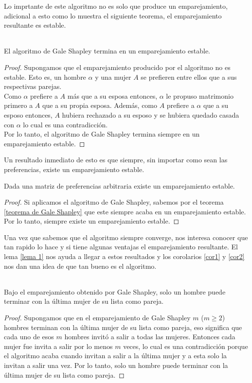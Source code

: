 Lo imprtante de este algoritmo no es solo que produce un emparejamiento, adicional a esto como lo muestra el siguiente teorema, el emparejamiento resultante es estable. 
\begin{teo} \cite{GaleShapley} \\
\label{teorema de Gale Shapley}
El algoritmo de Gale Shapley termina en un emparejamiento estable.
\end{teo}
\begin{proof}
Supongamos que el emparejamiento producido por el algoritmo no es estable. Esto es, un hombre $\alpha$ y una mujer $A$ se prefieren entre ellos que a sus respectivas parejas. \\
Como $\alpha$ prefiere a $A$ más que a su esposa entonces, $\alpha$ le propuso matrimonio primero a $A$ que a su propia esposa. 
Además, como $A$ prefiere a $\alpha$ que a su esposo entonces, $A$ hubiera rechazado a su esposo y se hubiera quedado casada con $\alpha$ lo cual es una contradicción. \\
Por lo tanto, el algoritmo de Gale Shapley termina siempre en un emparejamiento estable. 
\end{proof}
Un resultado inmediato de esto es que siempre, sin importar como sean las preferencias, existe un emparejamiento estable. 
\begin{cor}
\label{corexiste}
Dada una matriz de preferencias arbitraria existe un emparejamiento estable. 
\end{cor}
\begin{proof}
Si aplicamos el algoritmo de Gale Shapley, sabemos por el teorema \ref{teorema de Gale Shapley} que este siempre acaba en un emparejamiento estable. Por lo tanto, siempre existe un emparejamiento estable.
\end{proof}

Una vez que sabemos que el algoritmo siempre converge, nos interesa conocer que tan rapido lo hace y si tiene algunas ventajas el emparejamiento resultante. El lema \ref{lema 1} nos ayuda a llegar a estos resultados y los corolarios \ref{cor1} y \ref{cor2} nos dan una idea de que tan bueno es el algoritmo. 
\begin{lem} 
\label{lema 1} \cite{Knuth} \\
Bajo el emparejamiento obtenido por Gale Shapley, solo un hombre puede terminar con la última mujer de su lista como pareja. 
\end{lem}

\begin{proof}

Supongamos que en el emparejamiento de Gale Shapley $m$ ($m\geq2$) hombres terminan con la última mujer de su lista como pareja, eso significa que cada uno de esos $m$ hombres invitó a salir a todas las mujeres. Entonces cada mujer fue invita a salir por lo menos $m$ veces, lo cual es una contradicción porque el algoritmo acaba cuando invitan a salir a la última mujer y a esta solo la invitan a salir una vez. Por lo tanto, solo un hombre puede terminar con la última mujer de su lista como pareja. 
\end{proof}


